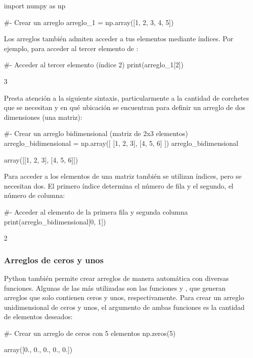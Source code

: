 \begin{pyin}
import numpy as np

#- Crear un arreglo
arreglo_1 = np.array([1, 2, 3, 4, 5])
\end{pyin}

Los arreglos también admiten acceder a tus elementos mediante índices. Por ejemplo, para acceder al tercer elemento de :
\begin{pyin}[]
#- Acceder al tercer elemento (índice 2)
print(arreglo_1[2])
\end{pyin}
\begin{pyprint}
3
\end{pyprint}

Presta atención a la siguiente sintaxis, particularmente a la cantidad de corchetes que se necesitan y en qué ubicación se encuentran para definir un arreglo de dos dimensiones (una matriz):

\begin{pyin}[]
#- Crear un arreglo bidimensional (matriz de 2x3 elementos)
arreglo_bidimensional = np.array([ [1, 2, 3], [4, 5, 6] ])
arreglo_bidimensional
\end{pyin}
\begin{pyout}
array([[1, 2, 3],
       [4, 5, 6]])
\end{pyout}

Para acceder a los elementos de una matriz también se utilizan índices, pero se necesitan dos. El primero índice determina el número de fila y el segundo, el número de columna:

\begin{pyin}[]
#- Acceder al elemento de la primera fila y segunda columna
print(arreglo_bidimensional[0, 1])
\end{pyin}
\begin{pyprint}
2
\end{pyprint}

\subsubsection{Arreglos de ceros y unos}
Python también permite crear arreglos de manera automática con diversas funciones. Algunas de las más utilizadas son las funciones  y , que generan arreglos que solo contienen ceros y unos, respectivamente. Para crear un arreglo unidimensional de ceros y unos, el argumento de ambas funciones es la cantidad de elementos deseados:

\begin{pyin}[]
#- Crear un arreglo de ceros con 5 elementos
np.zeros(5)
\end{pyin}
\begin{pyout}
array([0., 0., 0., 0., 0.])
\end{pyout}

